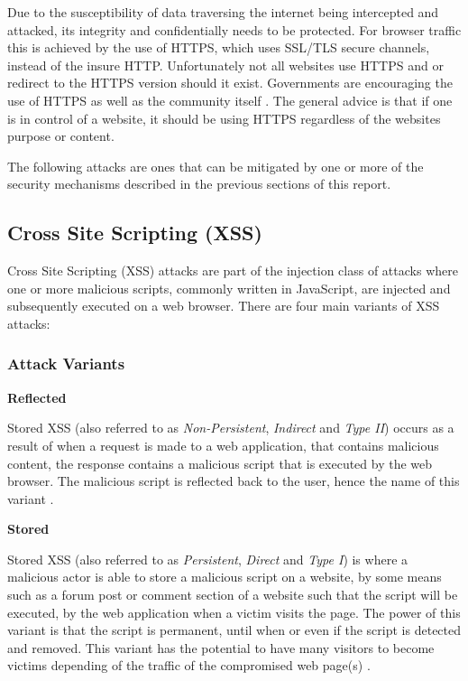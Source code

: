 \documentclass{mscreport}
\begin{document}
\vspace{0.3cm} \noindent
Due to the susceptibility of data traversing the internet being intercepted and attacked, its integrity and confidentially needs to be protected. For browser traffic this is achieved by the use of HTTPS, which uses SSL/TLS secure channels, instead of the insure HTTP. Unfortunately not all websites use HTTPS and or redirect to the HTTPS version should it exist. Governments are encouraging the use of HTTPS \cite{noauthor_undated-oz} as well as the community itself \cite{noauthor_undated-xk}. The general advice is that if one is in control of a website, it should be using HTTPS regardless of the websites purpose or content. 

\vspace{0.3cm} \noindent
The following attacks are ones that can be mitigated by one or more of the security mechanisms described in the previous sections of this report.

\subsection{Cross Site Scripting (XSS)}
\label{subsection:XSS}

Cross Site Scripting (XSS) attacks are part of the injection class of attacks where one or more malicious scripts, commonly written in JavaScript, are injected and subsequently executed on a web browser. There are four main variants of XSS attacks:

\subsubsection{Attack Variants}
\textbf{Reflected}

\vspace{0.2cm} \noindent
Stored XSS (also referred to as \textit{Non-Persistent}, \textit{Indirect} and \textit{Type II}) occurs as a result of when a request is made to a web application, that contains malicious content, the response contains a malicious script that is executed by the web browser. The malicious script is reflected back to the user, hence the name of this variant \cite{Rodriguez2020-bg}.

\vspace{0.6cm} \noindent
\textbf{Stored}

\vspace{0.2cm} \noindent
Stored XSS (also referred to as \textit{Persistent}, \textit{Direct} and \textit{Type I}) is where a malicious actor is able to store a malicious script on a website, by some means such as a forum post or comment section of a website such that the script will be executed, by the web application when a victim visits the page. The power of this variant is that the script is permanent, until when or even if the script is detected and removed. This variant has the potential to have many visitors to become victims depending of the traffic of the compromised web page(s) \cite{Rodriguez2020-bg}.
\end{document}
